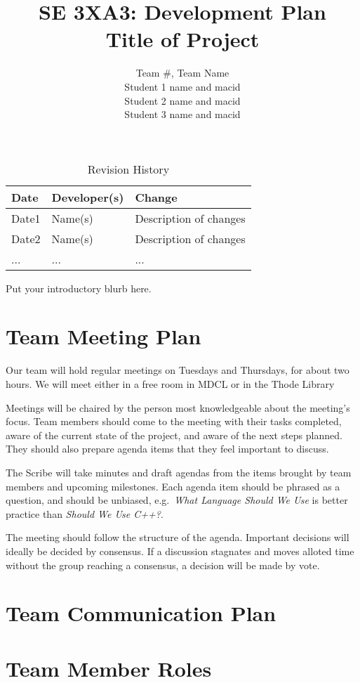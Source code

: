 \documentclass{article}
\title{SE 3XA3: Development Plan\\Title of Project}
\author{Team \#, Team Name
		\\ Student 1 name and macid
		\\ Student 2 name and macid
		\\ Student 3 name and macid
}
\date{}
\begin{document}
\begin{table}[hp]
\caption{Revision History} \label{TblRevisionHistory}
\begin{tabularx}{\textwidth}{llX}
\toprule
\textbf{Date} & \textbf{Developer(s)} & \textbf{Change}\\
\midrule
Date1 & Name(s) & Description of changes\\
Date2 & Name(s) & Description of changes\\
... & ... & ...\\
\bottomrule
\end{tabularx}
\end{table}

\newpage

\maketitle
Put your introductory blurb here.

\section{Team Meeting Plan} %
Our team will hold regular meetings on Tuesdays and Thursdays, for about two hours. We will meet either in a free room in MDCL or in the Thode Library

  Meetings will be chaired by the person most knowledgeable about the meeting's focus. Team members should come to the meeting with their tasks completed, aware of the current state of the project, and aware of the next steps planned. They should also prepare agenda items that they feel important to discuss. 

  The Scribe will take minutes and draft agendas from the items brought by team members and upcoming milestones. Each agenda item should be phrased as a question, and should be unbiased, e.g.\ \textit{What Language Should We Use} is better practice than \textit{Should We Use C++?}.

  The meeting should follow the structure of the agenda. Important decisions will ideally be decided by consensus. If a discussion stagnates and moves alloted time without the group reaching a consensus, a decision will be made by vote.
\section{Team Communication Plan} %

\section{Team Member Roles} %
\end{document}
